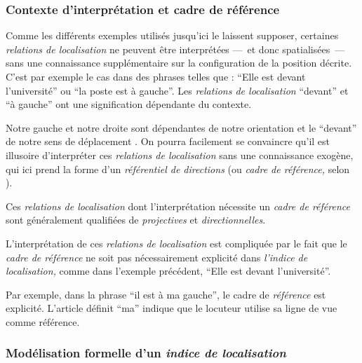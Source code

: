 \subsubsection{Contexte d'interprétation et cadre de référence}



Comme les différents exemples utilisés jusqu'ici le laissent supposer,
certaines \emph{relations de localisation} ne peuvent être
interprétées ---~et donc spatialisées~--- sans une connaissance
supplémentaire sur la configuration de la position décrite. C'est par
exemple le cas dans des phrases telles que : \enquote{Elle est devant
  l'université} ou \enquote{la poste est à gauche}. Les
\emph{relations de localisation} \enquote{devant} et \enquote{à
  gauche} ont une signification dépendante du contexte.

Notre gauche
et notre droite sont dépendantes de notre orientation et le
\enquote{devant} de notre sens de déplacement
\autocite{Vandeloise1986}. On pourra facilement se convaincre qu'il
est illusoire d'interpréter ces \emph{relations de localisation} sans
une connaissance exogène, qui ici prend la forme d'un
\emph{référentiel de directions} (ou \emph{cadre de référence,} selon
\cite{Clementini2013}).

Ces \emph{relations de localisation} dont l'interprétation nécessite
un \emph{cadre de référence} sont généralement qualifiées de
\emph{projectives} et \emph{directionnelles}.

L'interprétation de ces \emph{relations de localisation} est
compliquée par le fait que le \emph{cadre de référence} ne soit pas
nécessairement explicité dans \emph{l'indice de localisation,} comme
dans l'exemple précédent, \enquote{Elle est devant l'université}.

Par exemple, dans la phrase \enquote{il est à ma gauche}, le cadre de
\emph{référence} est explicité. L'article définit \enquote{ma} indique
que le locuteur utilise sa ligne de vue comme référence.

\subsubsection{Modélisation formelle d'un \emph{indice de localisation}}

